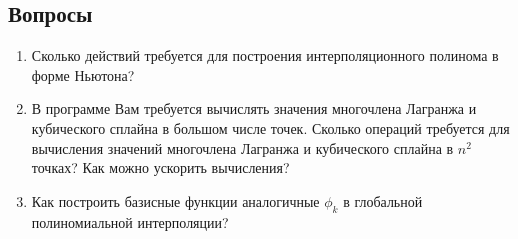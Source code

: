 \documentclass[12pt]{article}
\date{}
\author{}
\begin{document}
	\subsection{Вопросы}
	\begin{enumerate}
		\item Сколько действий требуется для построения интерполяционного полинома в форме Ньютона?
		\item В программе Вам требуется вычислять значения многочлена Лагранжа и кубического сплайна в большом числе точек. Сколько операций требуется для вычисления значений многочлена Лагранжа и кубического сплайна в $n^2$ точках? Как можно ускорить вычисления?
		\item Как построить базисные функции аналогичные $\phi_k$ в глобальной полиномиальной интерполяции?
	\end{enumerate}
\end{document}

